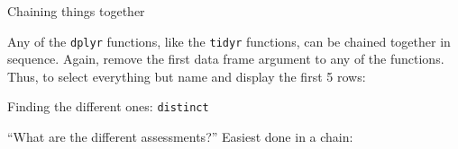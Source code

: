\begin{frame}[fragile]{Chaining things together}
  
Any of the \texttt{dplyr} functions, like the \texttt{tidyr}
functions, can be chained together in sequence. Again, remove the
first data frame argument to any of the functions. Thus, to select
everything but name and display the first 5 rows:

\begin{knitrout}
\color{fgcolor}
\end{knitrout}
  
\end{frame}

\begin{frame}[fragile]{Finding the different ones: \texttt{distinct}}
  
  ``What are the different
  assessments?'' Easiest done in a chain:
  
\begin{knitrout}
\color{fgcolor}
\end{knitrout}
  
\end{frame}

